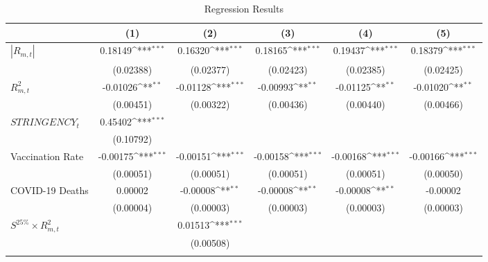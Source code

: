 \begin{table}[htbp]\centering
\def\sym#1{\ifmmode^{#1}\else\(^{#1}\)\fi}
\caption{Regression Results \label{reg1}}
\begin{tabular}{l*{5}{c}}
\toprule
                    &\multicolumn{1}{c}{(1)}         &\multicolumn{1}{c}{(2)}         &\multicolumn{1}{c}{(3)}         &\multicolumn{1}{c}{(4)}         &\multicolumn{1}{c}{(5)}         \\
\midrule
$|R_{m,t}|$ &     0.18149\sym{***}&     0.16320\sym{***}&     0.18165\sym{***}&     0.19437\sym{***}&     0.18379\sym{***}\\
                    &   (0.02388)         &   (0.02377)         &   (0.02423)         &   (0.02385)         &   (0.02425)         \\
\addlinespace
$R_{m,t}^2$ &    -0.01026\sym{**} &    -0.01128\sym{***}&    -0.00993\sym{**} &    -0.01125\sym{**} &    -0.01020\sym{**} \\
                    &   (0.00451)         &   (0.00322)         &   (0.00436)         &   (0.00440)         &   (0.00466)         \\
\addlinespace
$STRINGENCY_t$    &     0.45402\sym{***}&                     &                     &                     &                     \\
                    &   (0.10792)         &                     &                     &                     &                     \\
\addlinespace
Vaccination Rate    &    -0.00175\sym{***}&    -0.00151\sym{***}&    -0.00158\sym{***}&    -0.00168\sym{***}&    -0.00166\sym{***}\\
                    &   (0.00051)         &   (0.00051)         &   (0.00051)         &   (0.00051)         &   (0.00050)         \\
\addlinespace
COVID-19 Deaths &     0.00002         &    -0.00008\sym{**} &    -0.00008\sym{**} &    -0.00008\sym{**} &    -0.00002         \\
                    &   (0.00004)         &   (0.00003)         &   (0.00003)         &   (0.00003)         &   (0.00003)         \\
\addlinespace

$S^{25\%}\times{R_{m,t}^2}$ &                     &     0.01513\sym{***}&                     &                     &                     \\
                    &                     &   (0.00508)         &                     &                     &                     \\
\addlinespace
  

\end{tabular}
\end{table}
